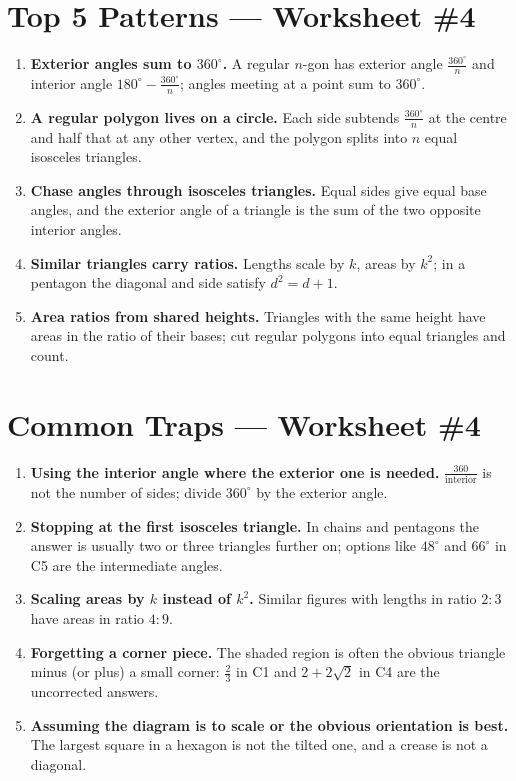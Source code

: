 \documentclass[11pt,a4paper]{article}
\begin{document}
\section*{Top 5 Patterns --- Worksheet \#4}
\begin{enumerate}[leftmargin=2em, itemsep=4pt]
  \item \textbf{Exterior angles sum to $360^\circ$.} A regular $n$-gon has exterior angle $\tfrac{360^\circ}{n}$ and interior angle $180^\circ-\tfrac{360^\circ}{n}$; angles meeting at a point sum to $360^\circ$. 
  \item \textbf{A regular polygon lives on a circle.} Each side subtends $\tfrac{360^\circ}{n}$ at the centre and half that at any other vertex, and the polygon splits into $n$ equal isosceles triangles. 
  \item \textbf{Chase angles through isosceles triangles.} Equal sides give equal base angles, and the exterior angle of a triangle is the sum of the two opposite interior angles. 
  \item \textbf{Similar triangles carry ratios.} Lengths scale by $k$, areas by $k^2$; in a pentagon the diagonal and side satisfy $d^2=d+1$. 
  \item \textbf{Area ratios from shared heights.} Triangles with the same height have areas in the ratio of their bases; cut regular polygons into equal triangles and count. 
\end{enumerate}

\section*{Common Traps --- Worksheet \#4}
\begin{enumerate}[leftmargin=2em, itemsep=4pt]
  \item \textbf{Using the interior angle where the exterior one is needed.} $\tfrac{360}{\text{interior}}$ is not the number of sides; divide $360^\circ$ by the exterior angle. 
  \item \textbf{Stopping at the first isosceles triangle.} In chains and pentagons the answer is usually two or three triangles further on; options like $48^\circ$ and $66^\circ$ in C5 are the intermediate angles. 
  \item \textbf{Scaling areas by $k$ instead of $k^2$.} Similar figures with lengths in ratio $2:3$ have areas in ratio $4:9$. 
  \item \textbf{Forgetting a corner piece.} The shaded region is often the obvious triangle minus (or plus) a small corner: $\tfrac23$ in C1 and $2+2\sqrt2$ in C4 are the uncorrected answers. 
  \item \textbf{Assuming the diagram is to scale or the obvious orientation is best.} The largest square in a hexagon is not the tilted one, and a crease is not a diagonal. 
\end{enumerate}

\end{document}
